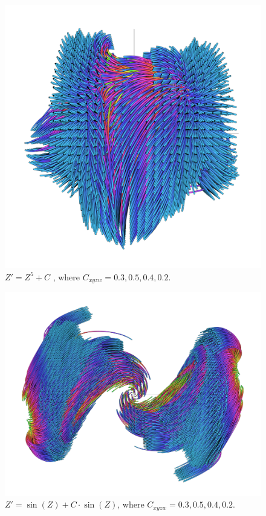 \documentclass[12pt]{article}
\begin{document}
\begin{figure} 
  \includegraphics[width=\textwidth]{4.png}	
  \caption{$Z' = Z^5 + C$ , where $C_{xyzw} = 0.3, 0.5, 0.4, 0.2$.}
\end{figure}

\begin{figure} 
  \includegraphics[width=\textwidth]{5.png}	
  \caption{$Z' = \sin(Z) + C\cdot\sin(Z)$, where $C_{xyzw} = 0.3, 0.5, 0.4, 0.2$.}
\end{figure}
 


\end{document}
